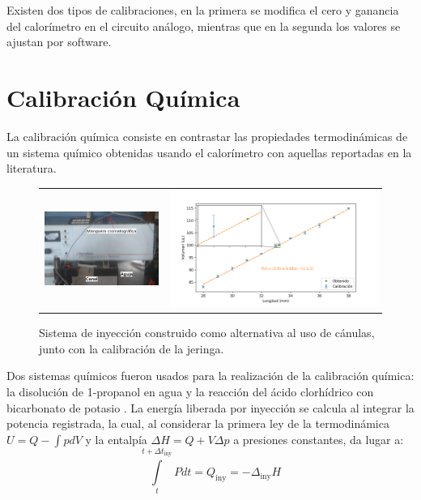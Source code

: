 \documentclass[a0]{sciposter}
\begin{document}
\begin{multicols}{3}
	Existen dos tipos de calibraciones, en la primera se modifica el cero y ganancia del calorímetro en el circuito análogo, mientras que en la segunda los valores se ajustan por software. 

\section{Calibraci\'on Qu\'imica}
	La calibraci\'on qu\'imica consiste en contrastar las propiedades termodin\'amicas de un sistema qu\'imico obtenidas usando el calor\'imetro con aquellas reportadas en la literatura. 
	\begin{figure}[h]
		\centering
		\begin{tabular}{cc}
			\includegraphics[width=0.4\linewidth]{../Tesis/Figures/sistemaInyeccion} & 
			\includegraphics[width=0.6\linewidth]{../Data/Syringe/syringe_cal.png}
		\end{tabular}
		\caption{Sistema de inyección construido como alternativa al uso de cánulas, junto con la calibración de la jeringa.}
	\end{figure}

	Dos sistemas qu\'imicos fueron usados para la realizaci\'on de la calibraci\'on qu\'imica: la disoluci\'on de 1-propanol en agua y la reacci\'on del \'acido clorhídrico con bicarbonato de potasio \cite{demarse2011calibration, adao2012chemical, nanoitc}. La energía liberada por inyección se calcula al integrar la potencia registrada, la cual, al considerar la primera ley de la termodinámica $U = Q-\int pdV$ y la entalpía $\Delta H = Q + V\Delta p$ a presiones constantes, da lugar a:
	\begin{equation}
		\int\limits_t^{t+\Delta t_\text{iny}} Pdt = Q_\text{iny} = -\Delta_\text{iny}H
	\end{equation}
	

\end{multicols}
\end{document}
